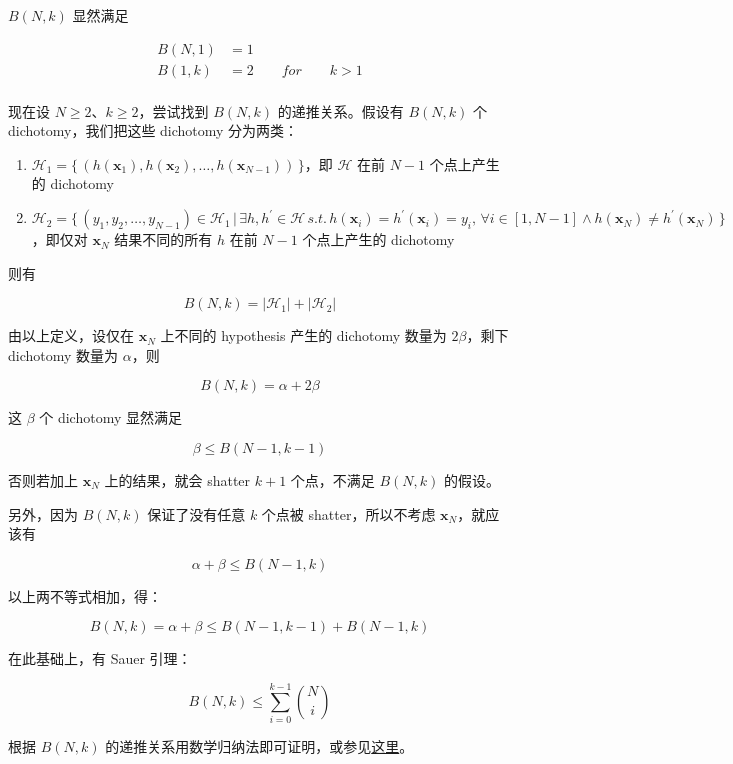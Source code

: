 \documentclass[a4paper]{article}
\begin{document}
$B(N, k)$ 显然满足

\begin{equation}
\begin{aligned}
B(N, 1) &= 1 \\
B(1, k) &= 2 \qquad for \qquad k > 1 \\
\end{aligned}
\end{equation}

现在设 $N \ge 2$、$k \ge 2$，尝试找到 $B(N, k)$ 的递推关系。假设有 $B(N, k)$ 个 dichotomy，我们把这些 dichotomy 分为两类：
\begin{enumerate}
  \item $\mathcal{H}_1 = \{ \,  (h(\mathbf{x}_1), h(\mathbf{x}_2), \dots, h(\mathbf{x}_{N-1})) \, \}$，即 $\mathcal{H}$ 在前 $N-1$ 个点上产生的 dichotomy  
  \item $\mathcal{H}_2 = \{ \,  (y_1, y_2, \dots, y_{N-1}) \in \mathcal{H}_1 \, | \, \exists h, h^{\prime} \in \mathcal{H} \, s.t. \, h(\mathbf{x}_i) = h^{\prime}(\mathbf{x}_i) = y_i, \, \forall i \in [1, N-1] \wedge h(\mathbf{x}_N) \neq h^{\prime}(\mathbf{x}_N) \, \}$，即仅对 $\mathbf{x}_N$ 结果不同的所有 $h$ 在前 $N-1$ 个点上产生的 dichotomy
\end{enumerate}

则有

$$B(N, k) = |\mathcal{H}_1| + |\mathcal{H}_2|$$

由以上定义，设仅在 $\mathbf{x}_N$ 上不同的 hypothesis 产生的 dichotomy 数量为 $2\beta$，剩下 dichotomy 数量为 $\alpha$，则

$$B(N, k) = \alpha + 2\beta$$

这 $\beta$ 个 dichotomy 显然满足

$$\beta \le B(N-1, k-1)$$

否则若加上 $\mathbf{x}_N$ 上的结果，就会 shatter $k+1$ 个点，不满足 $B(N, k)$ 的假设。

另外，因为 $B(N, k)$ 保证了没有任意 $k$ 个点被 shatter，所以不考虑 $\mathbf{x}_N$，就应该有

$$\alpha + \beta \le B(N-1, k)$$

以上两不等式相加，得：

$$B(N, k) = \alpha + \beta \le B(N-1, k-1) + B(N-1, k)$$

在此基础上，有 Sauer 引理：

$$B(N, k) \le \sum_{i=0}^{k-1}\binom{N}{i}$$

根据 $B(N, k)$ 的递推关系用数学归纳法即可证明，或参见\href{http://www.shivani-agarwal.net/Teaching/E0370/Aug-2011/Lectures/4.pdf}{这里}。
\end{document}
